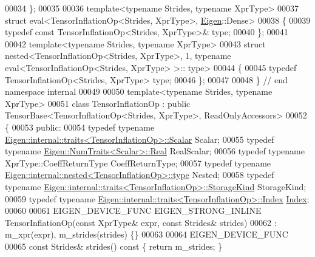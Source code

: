 \begin{DoxyCode}
00034 \};
00035 
00036 \textcolor{keyword}{template}<\textcolor{keyword}{typename} Str\textcolor{keywordtype}{id}es, \textcolor{keyword}{typename} XprType>
00037 \textcolor{keyword}{struct }eval<TensorInflationOp<Strides, XprType>, \hyperlink{namespace_eigen}{Eigen}::Dense>
00038 \{
00039   \textcolor{keyword}{typedef} \textcolor{keyword}{const} TensorInflationOp<Strides, XprType>& type;
00040 \};
00041 
00042 \textcolor{keyword}{template}<\textcolor{keyword}{typename} Str\textcolor{keywordtype}{id}es, \textcolor{keyword}{typename} XprType>
00043 \textcolor{keyword}{struct }nested<TensorInflationOp<Strides, XprType>, 1, typename eval<TensorInflationOp<Strides, XprType> >::
      type>
00044 \{
00045   \textcolor{keyword}{typedef} TensorInflationOp<Strides, XprType> type;
00046 \};
00047 
00048 \}  \textcolor{comment}{// end namespace internal}
00049 
00050 \textcolor{keyword}{template}<\textcolor{keyword}{typename} Str\textcolor{keywordtype}{id}es, \textcolor{keyword}{typename} XprType>
00051 \textcolor{keyword}{class }TensorInflationOp : \textcolor{keyword}{public} TensorBase<TensorInflationOp<Strides, XprType>, ReadOnlyAccessors>
00052 \{
00053   \textcolor{keyword}{public}:
00054   \textcolor{keyword}{typedef} \textcolor{keyword}{typename} \hyperlink{struct_eigen_1_1internal_1_1traits}{Eigen::internal::traits<TensorInflationOp>::Scalar}
       Scalar;
00055   \textcolor{keyword}{typedef} \textcolor{keyword}{typename} \hyperlink{group___sparse_core___module}{Eigen::NumTraits<Scalar>::Real} RealScalar;
00056   \textcolor{keyword}{typedef} \textcolor{keyword}{typename} XprType::CoeffReturnType CoeffReturnType;
00057   \textcolor{keyword}{typedef} \textcolor{keyword}{typename} \hyperlink{class_eigen_1_1internal_1_1_tensor_lazy_evaluator_writable}{Eigen::internal::nested<TensorInflationOp>::type}
       Nested;
00058   \textcolor{keyword}{typedef} \textcolor{keyword}{typename} \hyperlink{struct_eigen_1_1internal_1_1traits}{Eigen::internal::traits<TensorInflationOp>::StorageKind}
       StorageKind;
00059   \textcolor{keyword}{typedef} \textcolor{keyword}{typename} \hyperlink{struct_eigen_1_1internal_1_1traits}{Eigen::internal::traits<TensorInflationOp>::Index}
       \hyperlink{namespace_eigen_a62e77e0933482dafde8fe197d9a2cfde}{Index};
00060 
00061   EIGEN\_DEVICE\_FUNC EIGEN\_STRONG\_INLINE TensorInflationOp(\textcolor{keyword}{const} XprType& expr, \textcolor{keyword}{const} Strides& strides)
00062       : m\_xpr(expr), m\_strides(strides) \{\}
00063 
00064     EIGEN\_DEVICE\_FUNC
00065     \textcolor{keyword}{const} Strides& strides()\textcolor{keyword}{ const }\{ \textcolor{keywordflow}{return} m\_strides; \}

\end{DoxyCode}
